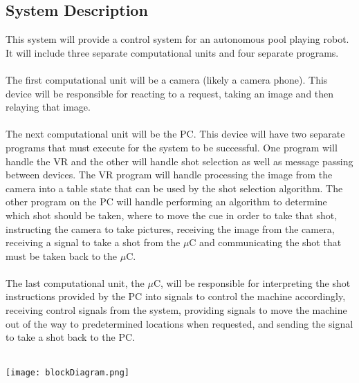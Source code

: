 \documentclass[titlepage]{article}
\begin{document}
\subsection{System Description}
This system will provide a control system for an autonomous pool playing robot. It will include three separate computational units and four separate programs.\\~\\
The first computational unit will be a camera (likely a camera phone). This device will be responsible for reacting to a request, taking an image and then relaying that image.\\~\\
The next computational unit will be the PC. This device will have two separate programs that must execute for the system to be successful. One program will handle the VR and the other will handle shot selection as well as message passing between devices. The VR program will handle processing the image from the camera into a table state that can be used by the shot selection algorithm. The other program on the PC will handle performing an algorithm to determine which shot should be taken, where to move the cue in order to take that shot, instructing the camera to take pictures, receiving the image from the camera, receiving a signal to take a shot from the $\mu$C and communicating the shot that must be taken back to the $\mu$C.\\~\\
The last computational unit, the $\mu$C, will be responsible for interpreting the shot instructions provided by the PC into signals to control the machine accordingly, receiving control signals from the system, providing signals to move the machine out of the way to predetermined locations when requested, and sending the signal to take a shot back to the PC.\\~\\
\begin{center}
	\texttt{[image: blockDiagram.png]}
\label{fig:block diagram}
\end{center}
\end{document}
